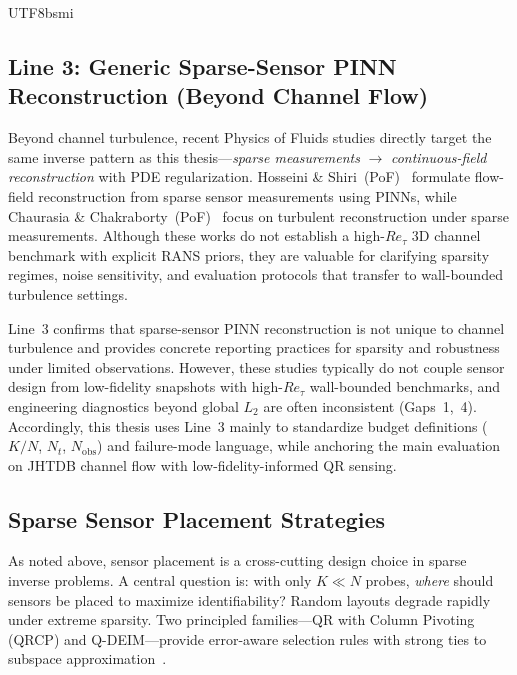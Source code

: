 \documentclass[master]{NTHUthesis}
\begin{document}
\begin{CJK*}{UTF8}{bsmi}
\subsection{Line 3: Generic Sparse-Sensor PINN Reconstruction (Beyond Channel Flow)}
\label{sec:lit_line3_generic}

Beyond channel turbulence, recent Physics of Fluids studies directly target the same inverse pattern as this thesis---\emph{sparse measurements} $\rightarrow$ \emph{continuous-field reconstruction} with PDE regularization. Hosseini \& Shiri\ (PoF)~\cite{10.1063/5.0211680} formulate flow-field reconstruction from sparse sensor measurements using PINNs, while Chaurasia \& Chakraborty\ (PoF)~\cite{10.1063/5.0218611} focus on turbulent reconstruction under sparse measurements. Although these works do not establish a high-$Re_\tau$ 3D channel benchmark with explicit RANS priors, they are valuable for clarifying sparsity regimes, noise sensitivity, and evaluation protocols that transfer to wall-bounded turbulence settings.

Line~3 confirms that sparse-sensor PINN reconstruction is not unique to channel turbulence and provides concrete reporting practices for sparsity and robustness under limited observations. However, these studies typically do not couple sensor design from low-fidelity snapshots with high-$Re_\tau$ wall-bounded benchmarks, and engineering diagnostics beyond global $L_2$ are often inconsistent (Gaps~1,~4). Accordingly, this thesis uses Line~3 mainly to standardize budget definitions ($K/N$, $N_t$, $N_{\text{obs}}$) and failure-mode language, while anchoring the main evaluation on JHTDB channel flow with low-fidelity-informed QR sensing.

\subsection{Sparse Sensor Placement Strategies}
\label{sec:sensing_strategies}
As noted above, sensor placement is a cross-cutting design choice in sparse inverse problems. A central question is: with only $K\!\ll\!N$ probes, \emph{where} should sensors be placed to maximize identifiability? Random layouts degrade rapidly under extreme sparsity. Two principled families---QR with Column Pivoting (QRCP) and Q-DEIM---provide error-aware selection rules with strong ties to subspace approximation~\cite{Drmac2016SISC}.


\end{CJK*}
\end{document}
